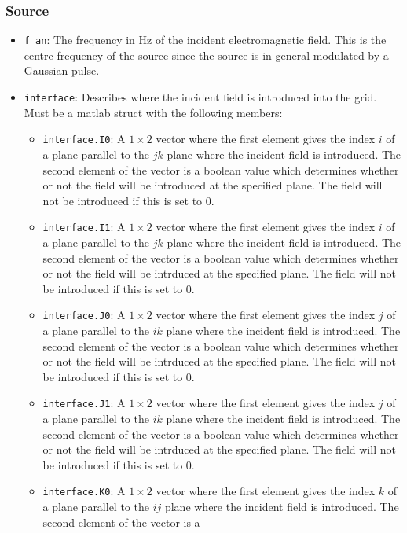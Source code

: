 \documentclass[a4paper, 12pt]{article}
\begin{document}
	\subsubsection{Source}
	\begin{itemize}
		\item \verb+f_an+: The frequency in Hz of the incident electromagnetic
		field. This is the centre frequency of the source since the source
		is in general modulated by a Gaussian pulse.
		\item \verb+interface+: Describes where the incident field is
		introduced into the grid. Must be a matlab struct with the following
		members:
		\begin{itemize}
			\item \verb+interface.I0+: A $1\times 2$ vector where the first element
			gives the index $i$ of a plane parallel to the $jk$ plane where the
			incident field is introduced. The second element of the vector is a
			boolean value which determines whether or not the field will be
			introduced at the specified plane. The field will not be introduced
			if this is set to 0.  
			\item \verb+interface.I1+: A $1\times 2$ vector where the first element
			gives the index $i$ of a plane parallel to the $jk$ plane where the
			incident field is introduced. The second element of the vector is a
			boolean value which determines whether or not the field will be
			intrduced at the specified plane. The field will not be introduced
			if this is set to 0.   
			\item \verb+interface.J0+: A $1\times 2$ vector where the first element
			gives the index $j$ of a plane parallel to the $ik$ plane where the
			incident field is introduced. The second element of the vector is a
			boolean value which determines whether or not the field will be
			intrduced at the specified plane. The field will not be introduced
			if this is set to 0.   
			\item \verb+interface.J1+: A $1\times 2$ vector where the first element
			gives the index $j$ of a plane parallel to the $ik$ plane where the
			incident field is introduced. The second element of the vector is a
			boolean value which determines whether or not the field will be
			intrduced at the specified plane. The field will not be introduced
			if this is set to 0.   
			\item \verb+interface.K0+: A $1\times 2$ vector where the first element
			gives the index $k$ of a plane parallel to the $ij$ plane where the
			incident field is introduced. The second element of the vector is a

\end{itemize}
\end{itemize}
\end{document}
